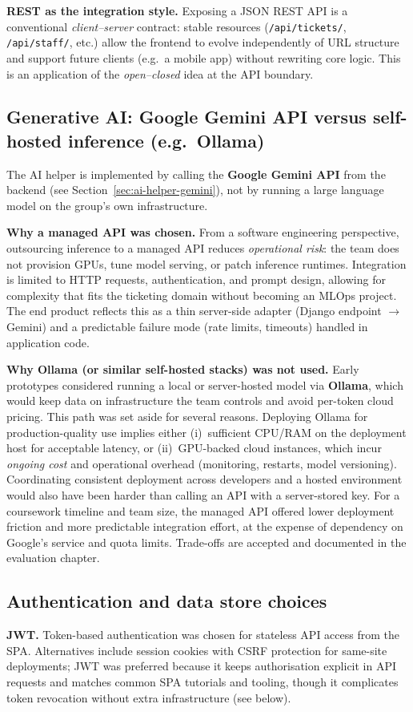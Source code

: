 \textbf{REST as the integration style.} Exposing a JSON REST API is a conventional \emph{client--server} contract: stable resources (\texttt{/api/tickets/}, \texttt{/api/staff/}, etc.) allow the frontend to evolve independently of URL structure and support future clients (e.g.\ a mobile app) without rewriting core logic. This is an application of the \emph{open--closed} idea at the API boundary.

\subsection{Generative AI: Google Gemini API versus self-hosted inference (e.g.\ Ollama)}
The AI helper is implemented by calling the \textbf{Google Gemini API} from the backend (see Section~\ref{sec:ai-helper-gemini}), not by running a large language model on the group’s own infrastructure.

\textbf{Why a managed API was chosen.} From a software engineering perspective, outsourcing inference to a managed API reduces \emph{operational risk}: the team does not provision GPUs, tune model serving, or patch inference runtimes. Integration is limited to HTTP requests, authentication, and prompt design, allowing for complexity that fits the ticketing domain without becoming an MLOps project. The end product reflects this as a thin server-side adapter (Django endpoint $\rightarrow$ Gemini) and a predictable failure mode (rate limits, timeouts) handled in application code.

\textbf{Why Ollama (or similar self-hosted stacks) was not used.} Early prototypes considered running a local or server-hosted model via \textbf{Ollama}, which would keep data on infrastructure the team controls and avoid per-token cloud pricing. This path was set aside for several reasons. Deploying Ollama for production-quality use implies either (i)~sufficient CPU/RAM on the deployment host for acceptable latency, or (ii)~GPU-backed cloud instances, which incur \emph{ongoing cost} and operational overhead (monitoring, restarts, model versioning). Coordinating consistent deployment across developers and a hosted environment would also have been harder than calling an API with a server-stored key. For a coursework timeline and team size, the managed API offered lower deployment friction and more predictable integration effort, at the expense of dependency on Google’s service and quota limits. Trade-offs are accepted and documented in the evaluation chapter.

\subsection{Authentication and data store choices}
\textbf{JWT.} Token-based authentication was chosen for stateless API access from the SPA. Alternatives include session cookies with CSRF protection for same-site deployments; JWT was preferred because it keeps authorisation explicit in API requests and matches common SPA tutorials and tooling, though it complicates token revocation without extra infrastructure (see below).

